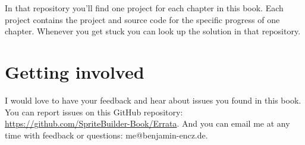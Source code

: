 In that repository you'll find one project for each chapter in this book. Each
project contains the \SB{} project and source code for the specific progress of
one chapter. Whenever you get stuck you can look up the solution in that
repository.

\section{Getting involved}
I would love to have your feedback and hear about issues you found in this book.
You can report issues on this GitHub repository:
\url{https://github.com/SpriteBuilder-Book/Errata}. And you can email me at any
time with feedback or questions: me@benjamin-encz.de.